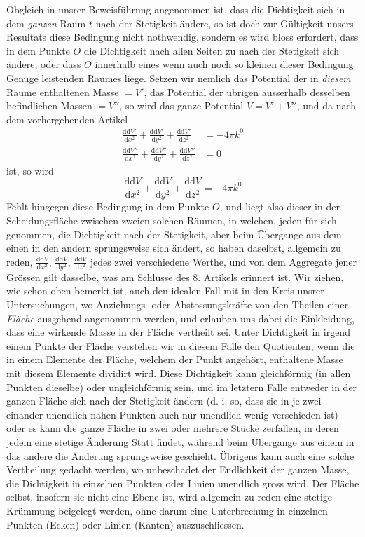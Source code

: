 Obgleich in unsrer Beweisführung angenommen ist, dass die Dichtigkeit sich in dem \textit{ganzen} Raum $t$ nach der Stetigkeit ändere, so ist doch zur Gültigkeit unsers Resultats diese Bedingung nicht nothwendig, sondern es wird bloss erfordert, dass in dem Punkte $O$ die Dichtigkeit nach allen Seiten zu nach der Stetigkeit sich ändere, oder dass $O$ innerhalb eines wenn auch noch so kleinen dieser Bedingung Genüge leistenden Raumes liege. Setzen wir nemlich das Potential der in \textit{diesem} Raume enthaltenen Masse $=V'$, das Potential der übrigen ausserhalb desselben befindlichen Massen $=V''$, so wird das ganze Potential $V=V'+V''$, und da nach dem vorhergehenden Artikel
\[
\begin{aligned}
\frac{\mathrm{d}\mathrm{d}V'}{\mathrm{d}x^2}+\frac{\mathrm{d}\mathrm{d}V'}{\mathrm{d}y^2}+\frac{\mathrm{d}\mathrm{d}V'}{\mathrm{d}z^2}&=-4\pi k^0\\
\frac{\mathrm{d}\mathrm{d}V''}{\mathrm{d}x^2}+\frac{\mathrm{d}\mathrm{d}V''}{\mathrm{d}y^2}+\frac{\mathrm{d}\mathrm{d}V''}{\mathrm{d}z^2}&=0
\end{aligned}
\]
ist, so wird
\[
\frac{\mathrm{d}\mathrm{d}V}{\mathrm{d}x^2}+\frac{\mathrm{d}\mathrm{d}V}{\mathrm{d}y^2}+\frac{\mathrm{d}\mathrm{d}V}{\mathrm{d}z^2}=-4\pi k^0
\]
Fehlt hingegen diese Bedingung in dem Punkte $O$, und liegt also dieser in der Scheidungsfläche zwischen zweien solchen Räumen, in welchen, jeden für sich genommen, die Dichtigkeit nach der Stetigkeit, aber beim Übergange aus dem einen in den andern sprungsweise sich ändert, so haben daselbst, allgemein zu reden, $\frac{\mathrm{d}\mathrm{d}V}{\mathrm{d}x^2}$, $\frac{\mathrm{d}\mathrm{d}V}{\mathrm{d}y^2}$, $\frac{\mathrm{d}\mathrm{d}V}{\mathrm{d}z^2}$ jedes zwei verschiedene Werthe, und von dem Aggregate jener Grössen gilt dasselbe, was am Schlusse des 8. Artikels erinnert ist.
%
Wir ziehen, wie schon oben bemerkt ist, auch den idealen Fall mit in den Kreis unsrer Untersuchungen, wo Anziehungs- oder Abstossungskräfte von den Theilen einer \textit{Fläche} ausgehend angenommen werden, und erlauben uns dabei die Einkleidung, dass eine wirkende Masse in der Fläche vertheilt sei. Unter Dichtigkeit in irgend einem Punkte der Fläche verstehen wir in diesem Falle den Quotienten, wenn die in einem Elemente der Fläche, welchem der Punkt angehört, enthaltene Masse mit diesem Elemente dividirt wird. Diese Dichtigkeit kann gleichförmig (in allen Punkten dieselbe) oder ungleichförmig sein, und im letztern Falle entweder in der ganzen Fläche sich nach der Stetigkeit ändern (d. i. so, dass sie in je zwei einander unendlich nahen Punkten auch nur unendlich wenig verschieden ist) oder es kann die ganze Fläche in zwei oder mehrere Stücke zerfallen, in deren jedem eine stetige Änderung Statt findet, während beim Übergange aus einem in das andere die Änderung sprungsweise geschieht. Übrigens kann auch eine solche Vertheilung gedacht werden, wo unbeschadet der Endlichkeit der ganzen Masse, die Dichtigkeit in einzelnen Punkten oder Linien unendlich gross wird. Der Fläche selbst, insofern sie nicht eine Ebene ist, wird allgemein zu reden eine stetige Krümmung beigelegt werden, ohne darum eine Unterbrechung in einzelnen Punkten (Ecken) oder Linien (Kanten) auszuschliessen.

